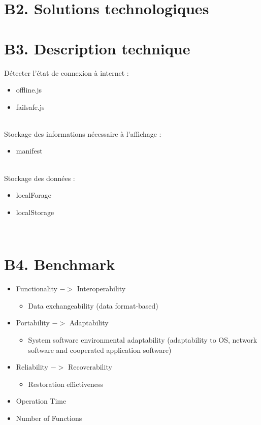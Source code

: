 \section{B2. Solutions technologiques}

\section{B3. Description technique}

Détecter l'état de connexion à internet :
	\begin{itemize}
		\item offline.js
		\item failsafe.js
	\end{itemize}
	~\\

Stockage des informations nécessaire à l’affichage :
	\begin{itemize}
		\item manifest
	\end{itemize}
	~\\
	
Stockage des données :
	\begin{itemize}
		\item localForage
		\item localStorage
	\end{itemize}
	~\\

\section{B4. Benchmark}

	\begin{itemize}
		\item Functionality $->$ Interoperability
			\begin{itemize}
				\item Data exchangeability (data format-based)
			\end{itemize}
		\item Portability $->$ Adaptability
			\begin{itemize}
				\item System software environmental adaptability (adaptability to OS, network software and cooperated application software)
			\end{itemize}
		\item Reliability $->$ Recoverability
			\begin{itemize}
				\item Restoration effictiveness
			\end{itemize}
		\item Operation Time
		\item Number of Functions
	\end{itemize}
	~\\

